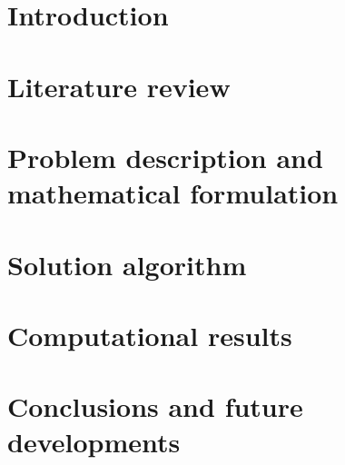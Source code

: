 \documentclass{Configuration_Files/PoliMi3i_thesis}
\theoremstyle{colored}
\theoremstyle{colored}
\begin{document}
    \chapter{Introduction}
    \label{chapter:introduction}%
    

    \chapter{Literature review}
    \label{chapter:literature}%
    

    \chapter{Problem description and mathematical formulation}
    \label{chapter:problem}%
    

    \chapter{Solution algorithm}
    \label{chapter:heuristics}%
    

    \chapter{Computational results}
    \label{chapther:experiments}%
    

    \chapter{Conclusions and future developments}
    \label{chapther:conclusions}%
    




    \cleardoublepage
    \appendix
\end{document}

